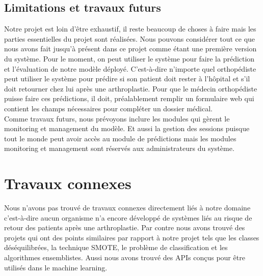 \documentclass[12pt, french]{report}
\begin{document}
\section{Limitations et travaux futurs}
Notre projet est loin d'être exhaustif, il reste beaucoup de choses à faire mais les parties essentielles du projet sont réalisées. Nous pouvons considérer tout ce que nous avons fait jusqu'à présent dans ce projet comme étant une première version du système. Pour le moment, on peut utiliser le système pour faire la prédiction et l'évaluation de notre modèle déployé. C'est-à-dire n'importe quel orthopédiste peut utiliser le système pour prédire si son patient doit rester à l'hôpital et s'il doit retourner chez lui après une arthroplastie. Pour que le médecin orthopédiste puisse faire ces prédictions, il doit, préalablement remplir un formulaire web qui contient les champs nécessaires pour compléter un dossier médical.   \\

Comme travaux futurs, nous prévoyons inclure les modules qui gèrent le monitoring et management du modèle. Et aussi la gestion des sessions puisque tout le monde peut avoir accès au module de prédictions mais les modules monitoring et management sont réservés aux administrateurs du système.    
\newpage

\chapter{Travaux connexes} \label{chap:relatedworks}
Nous n'avons pas trouvé de travaux connexes directement liés à notre domaine c'est-à-dire aucun organisme n'a encore développé de systèmes liés au risque de retour des patients après une arthroplastie. Par contre nous avons trouvé des projets qui ont des points similaires par rapport à notre projet tels que les classes déséquilibrées, la technique SMOTE, le problème de classification et les algorithmes ensemblistes. Aussi nous avons trouvé des APIs conçus pour être utilisés dans le machine learning.\\
\end{document}
